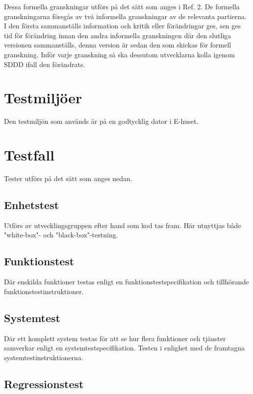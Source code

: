 \documentclass[a4paper]{article}
\begin{document}
Dessa formella granskningar utförs på det sätt som anges i Ref. 2. De formella granskningarna föregås av två informella granskningar av de relevanta partierna. I den första sammanställs information och kritik eller förändringar ges, sen ges tid för förändring innan den andra informella granskningen där den slutliga versionen sammanställs, denna version är sedan den som skickas för formell granskning. Inför varje granskning så ska dessutom utvecklarna kolla igenom SDDD ifall den förändrats.


\section{Testmiljöer}

Den testmiljön som används är på en godtycklig dator i E-huset.

\section{Testfall}

Tester utförs på det sätt som anges nedan.

\subsection{Enhetstest}

Utförs av utvecklingsgruppen efter hand som kod tas fram. Här utnyttjas både "white-box"- och "black-box"-testning.

\subsection{Funktionstest}

Där enskilda funktioner testas enligt en funktionstestspecifikation och tillhörande funktionstestinstruktioner. 

\subsection{Systemtest}

Där ett komplett system testas för att se hur flera funktioner och tjänster samverkar enligt en systemtestspecifikation. Testen i enlighet med de framtagna systemtestinstruktionerna. 

\subsection{Regressionstest}
\end{document}
